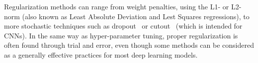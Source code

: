 Regularization methods can range from weight penalties, using the L1- or
L2-norm (also known as Least Absolute Deviation and Lest Squares regressions),
to more stochastic techniques such as dropout~\cite{Dropout} or
cutout~\cite{Cutout} (which is intended for CNNs). In the same way as
hyper-parameter tuning, proper regularization is often found through trial and
error, even though some methods can be considered as a generally effective
practices for most deep learning models.

